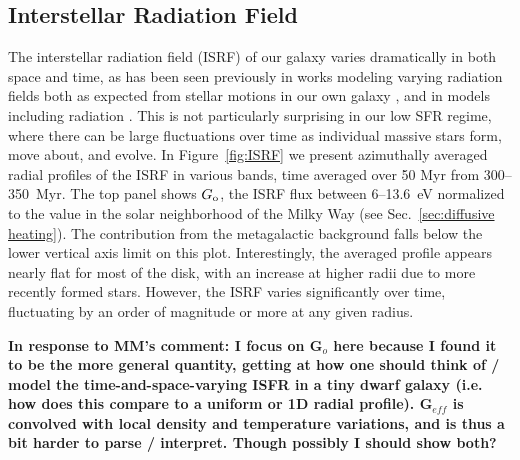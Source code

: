 \documentclass[twocolumn]{aastex61}
\begin{document}
\subsection{Interstellar Radiation Field}
\label{sec:ISRF}

The interstellar radiation field (ISRF) of our galaxy varies dramatically in both space and time, as has been seen previously in works modeling varying radiation fields both as expected from stellar motions in our own galaxy \citep{Parravano2003}, and in models including radiation \citep[e.g.][]{Hu2017}. This is not particularly surprising in our low SFR regime, where there can be large fluctuations over time as individual massive stars form, move about, and evolve. In Figure~\ref{fig:ISRF} we present azimuthally averaged radial profiles of the ISRF in various bands, time averaged over 50 Myr from 300--350~Myr. The top panel shows $G_{\rm o}$, the ISRF flux between 6--13.6~eV normalized to the value in the solar neighborhood of the Milky Way (see Sec.~\ref{sec:diffusive heating}). The contribution from the metagalactic background falls below the lower vertical axis limit on this plot. Interestingly, the averaged profile appears nearly flat for most of the disk, with an increase at higher radii due to more recently formed stars. However, the ISRF varies significantly over time, fluctuating by an order of magnitude or more at any given radius. 

\textbf{In response to MM's comment: I focus on G$_o$ here because I found it to be the more general quantity, getting at how one should think of / model the time-and-space-varying ISFR in a tiny dwarf galaxy (i.e. how does this compare to a uniform or 1D radial profile). G$_{eff}$ is convolved with local density and temperature variations, and is thus a bit harder to parse / interpret. Though possibly I should show both?}
\end{document}
